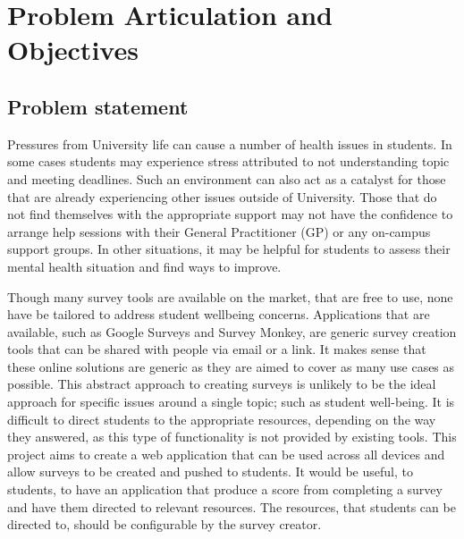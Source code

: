 \section{Problem Articulation and Objectives}

\subsection{Problem statement}

Pressures from University life can cause a number of health issues in students.
In some cases students may experience stress attributed to not understanding topic and meeting deadlines.
Such an environment can also act as a catalyst for those that are already experiencing other issues outside of University.
Those that do not find themselves with the appropriate support may not have the confidence to arrange help sessions with their
General Practitioner (GP) or any on-campus support groups. 
In other situations, it may be helpful for students to assess their mental health situation and find ways to improve.

Though many survey tools are available on the market, that are free to use, none have be tailored to address student wellbeing concerns.
Applications that are available, such as Google Surveys and Survey Monkey, are generic survey creation tools that can be shared with 
people via email or a link.
It makes sense that these online solutions are generic as they are aimed to cover as many use cases as possible.
This abstract approach to creating surveys is unlikely to be the ideal approach for specific issues around a single topic; such as
student well-being.
It is difficult to direct students to the appropriate resources, depending on the way they answered, as this type of functionality is not
provided by existing tools.
This project aims to create a web application that can be used across all devices and allow surveys to be created and pushed to students.
It would be useful, to students, to have an application that produce a score from completing a survey and have them directed to relevant
resources. 
The resources, that students can be directed to, should be configurable by the survey creator.

